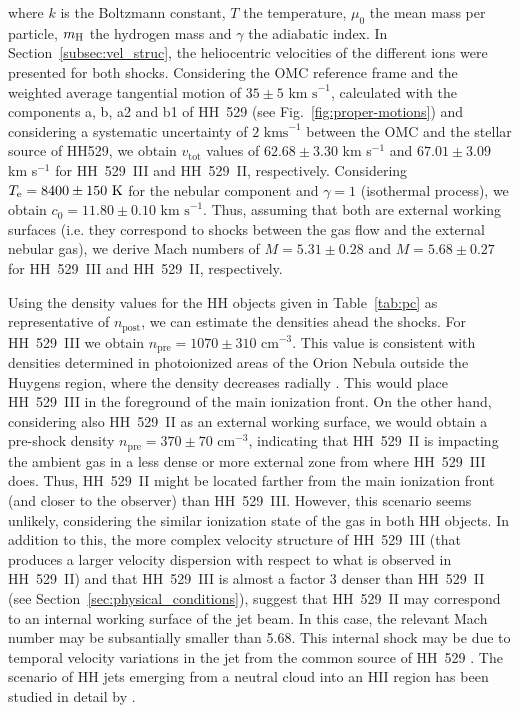 \documentclass[fleqn,usenatbib]{mnras}
\begin{document}
\noindent where $k$ is the Boltzmann constant, $T$ the temperature, $\mu_0$ the mean mass per particle, $m_{\text H}$ the hydrogen mass and $\gamma$ the adiabatic index. In Section~\ref{subsec:vel_struc}, the heliocentric velocities of the different ions were presented for both shocks. Considering the OMC reference frame \citep[$ 28 \pm 2$ km s$^{-1}$,][]{goudis82} and the weighted average tangential motion of $35 \pm 5 \text{ km s}^{-1}$, calculated with the components a, b, a2 and b1 of HH~529 (see Fig.~\ref{fig:proper-motions}) and considering a systematic uncertainty of $2 \text{ kms}^{-1}$ between the OMC and the stellar source of HH529, we obtain $v_{\text{tot}}$ values of $62.68 \pm 3.30$ km s$^{-1}$ and $67.01 \pm 3.09$ km s$^{-1}$ for HH~529~III and HH~529~II, respectively. Considering $T_{\rm e}=8400\pm 150 \text{ K}$ for the nebular component and $\gamma=1$ (isothermal process), we obtain $c_0=11.80 \pm 0.10 \text{ km s}^{-1}$. Thus, assuming that both are external working surfaces (i.e. they correspond to shocks between the gas flow and the external nebular gas), we derive Mach numbers of $M=5.31 \pm 0.28$ and $M=5.68 \pm 0.27$ for HH~529~III and HH~529~II, respectively. 

Using the density values for the HH objects given in Table~\ref{tab:pc} as representative of $n_{\text{post}}$, we can estimate the densities ahead the shocks. For HH~529~III we obtain $n_{\text{pre}}=1070 \pm 310 \text{ cm}^{-3}$. This value is consistent with densities determined in photoionized areas of the Orion Nebula outside the Huygens region, where the density decreases radially \citep{mesadelgado08}. This would place HH~529~III in the foreground of the main ionization front. On the other hand, considering also HH~529~II as an external working surface, we would obtain a pre-shock density $n_{\text{pre}}=370 \pm 70 \text{ cm}^{-3}$, indicating that HH~529~II is impacting the ambient gas in a less dense or more external zone from where HH~529~III does. Thus, HH~529~II might be located farther from the main ionization front (and closer to the observer) than HH~529~III. However, this scenario seems unlikely, considering the similar ionization state of the gas in both HH objects. In addition to this, the more complex velocity structure of HH~529~III (that produces a larger velocity dispersion with respect to what is observed in HH~529~II) and that HH~529~III is almost a factor 3 denser than HH~529~II (see Section~\ref{sec:physical_conditions}), suggest that HH~529~II may correspond to an internal working surface \citep{Masciadriyraga01} of the jet beam. In this case, the relevant Mach number may be subsantially smaller than 5.68. This internal shock may be due to temporal velocity variations in the jet from the common source of HH~529 \citep[possibly located at the star COUP 666, ][]{Odell15}. The scenario of HH jets emerging from a neutral cloud into an H\thinspace II region has been studied in detail by \citet{ragayreipurth04}.
\end{document}
